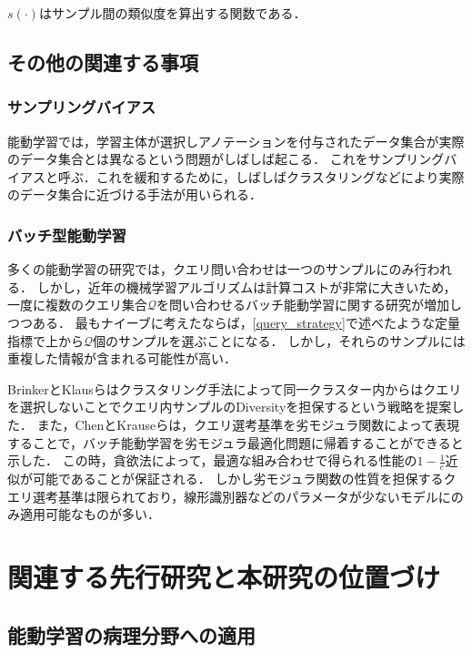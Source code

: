 $s(\cdot)$はサンプル間の類似度を算出する関数である．

\subsection{その他の関連する事項}
\subsubsection{サンプリングバイアス}
能動学習では，学習主体が選択しアノテーションを付与されたデータ集合が実際のデータ集合とは異なるという問題がしばしば起こる．
これをサンプリングバイアスと呼ぶ．これを緩和するために，しばしばクラスタリングなどにより実際のデータ集合に近づける手法が用いられる．

\subsubsection{バッチ型能動学習}
多くの能動学習の研究では，クエリ問い合わせは一つのサンプルにのみ行われる．
しかし，近年の機械学習アルゴリズムは計算コストが非常に大きいため，一度に複数のクエリ集合$\mathcal{Q}$を問い合わせるバッチ能動学習に関する研究が増加しつつある．
最もナイーブに考えたならば，\ref{query_strategy}で述べたような定量指標で上から$\mathcal{Q}$個のサンプルを選ぶことになる．
しかし，それらのサンプルには重複した情報が含まれる可能性が高い．

BrinkerとKlausらはクラスタリング手法によって同一クラスター内からはクエリを選択しないことでクエリ内サンプルのDiversityを担保するという戦略を提案した\cite{brinker2003incorporating}．
また，ChenとKrauseらは，クエリ選考基準を劣モジュラ関数によって表現することで，バッチ能動学習を劣モジュラ最適化問題に帰着することができると示した\cite{chen2013near}．
この時，貪欲法によって，最適な組み合わせで得られる性能の$1 - \frac{1}{e}$近似が可能であることが保証される．
しかし劣モジュラ関数の性質を担保するクエリ選考基準は限られており，線形識別器などのパラメータが少ないモデルにのみ適用可能なものが多い．

\section{関連する先行研究と本研究の位置づけ}

\subsection{能動学習の病理分野への適用}

